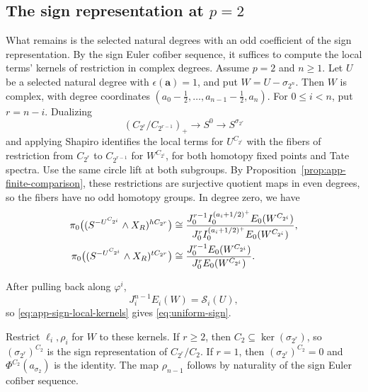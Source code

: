 \subsection{The sign representation at \texorpdfstring{$p=2$}{p=2}}

What remains is the selected natural degrees with an odd
coefficient of the sign representation. By the sign Euler cofiber sequence, it suffices to compute the local terms' kernels of restriction in complex degrees.
Assume $p=2$ and $n\geq1$. Let $U$ be a
selected natural degree with $\epsilon(\mathbf a)=1$, and put
$W=U-\sigma_{2^n}$. Then $W$ is complex, with degree coordinates
$(a_0-\tfrac12,\ldots,a_{n-1}-\tfrac12,a_n)$.
For $0\le i<n$, put $r=n-i$. Dualizing
\[
(C_{2^r}/C_{2^{r-1}})_+\longrightarrow S^0
\longrightarrow S^{\sigma_{2^r}}
\]
and applying Shapiro identifies the local terms for $U^{C_{2^i}}$
with the fibers of restriction from $C_{2^r}$ to $C_{2^{r-1}}$
for $W^{C_{2^i}}$, for both homotopy fixed points and Tate spectra.
Use the same circle lift at both subgroups.
By Proposition~\ref{prop:app-finite-comparison}, these restrictions
are surjective quotient maps in even degrees, so the fibers have
no odd homotopy groups.
In degree zero, we have
\begin{align}
 \pi_0\bigl((S^{-U^{C_{2^i}}}\wedge X_R)^{hC_{2^r}}\bigr)
   &\cong\frac{J_0^{r-1}I_0^{(a_i+1/2)^+}E_0(W^{C_{2^i}})}
           {J_0^rI_0^{(a_i+1/2)^+}E_0(W^{C_{2^i}})},\notag\\
 \pi_0\bigl((S^{-U^{C_{2^i}}}\wedge X_R)^{tC_{2^r}}\bigr)
   &\cong\frac{J_0^{r-1}E_0(W^{C_{2^i}})}{J_0^rE_0(W^{C_{2^i}})}.
 \label{eq:app-sign-local-kernels}
\end{align}

After pulling back along $\varphi^i$,
\[
J_i^{n-1}E_i(W)=\mathcal S_i(U),
\]
so \eqref{eq:app-sign-local-kernels} gives \eqref{eq:uniform-sign}.

Restrict $\ell_i,\rho_i$ for $W$ to these kernels.
If $r\ge2$, then $C_2\subseteq\ker(\sigma_{2^r})$, so
$(\sigma_{2^r})^{C_2}$ is the sign representation of $C_{2^r}/C_2$.
If $r=1$, then $(\sigma_{2^r})^{C_2}=0$ and $\Phi^{C_2}(a_{\sigma_2})$
is the identity. The map $\rho_{n-1}$ follows by naturality
of the sign Euler cofiber sequence.

